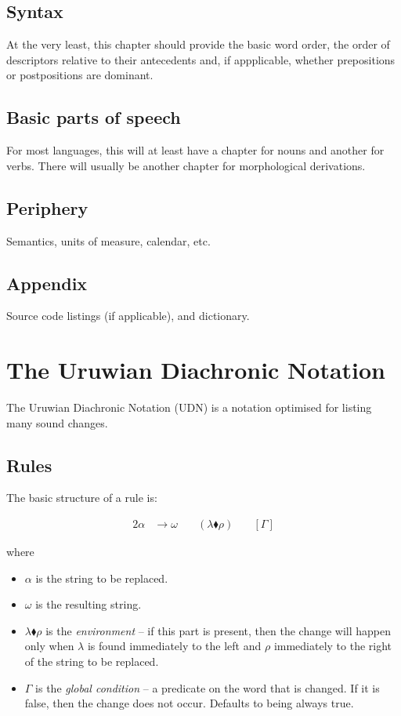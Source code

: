 \documentclass{book}
\begin{document}
\section{Syntax}

At the very least, this chapter should provide the basic word order, the order of descriptors relative to their antecedents and, if appplicable, whether prepositions or postpositions are dominant.

\section{Basic parts of speech}

For most languages, this will at least have a chapter for nouns and another for verbs. There will usually be another chapter for morphological derivations.

\section{Periphery}

Semantics, units of measure, calendar, etc.

\section{Appendix}

Source code listings (if applicable), and dictionary.

\chapter{The Uruwian Diachronic Notation}
\label{chapter:udn}

The Uruwian Diachronic Notation (UDN) is a notation optimised for listing many sound changes.

\section{Rules}

The basic structure of a rule is:

\begin{alignat}{2}
  \alpha &\rightarrow \omega &\quad(\lambda \blacklozenge \rho) &\quad[\Gamma]
\end{alignat}

where

\begin{itemize}
  \item $\alpha$ is the string to be replaced.
  \item $\omega$ is the resulting string.
  \item $\lambda \blacklozenge \rho$ is the \emph{environment} -- if this part is present, then the change will happen only when $\lambda$ is found immediately to the left and $\rho$ immediately to the right of the string to be replaced.
  \item $\Gamma$ is the \emph{global condition} -- a predicate on the word that is changed. If it is false, then the change does not occur. Defaults to being always true.
\end{itemize}
\end{document}

